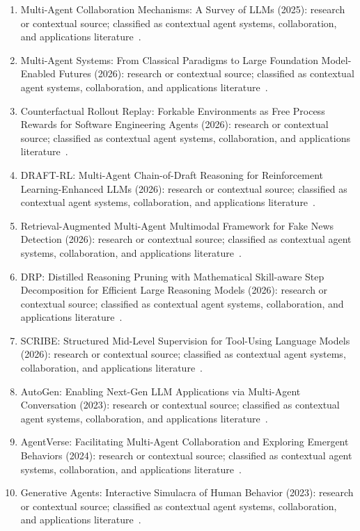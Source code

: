 \begin{enumerate}
\item Multi-Agent Collaboration Mechanisms: A Survey of {LLM}s (2025): research or contextual source; classified as contextual agent systems, collaboration, and applications literature~\cite{ext045}.
\item Multi-Agent Systems: From Classical Paradigms to Large Foundation Model-Enabled Futures (2026): research or contextual source; classified as contextual agent systems, collaboration, and applications literature~\cite{ext046}.
\item {Counterfactual Rollout Replay: Forkable Environments as Free Process Rewards for Software Engineering Agents} (2026): research or contextual source; classified as contextual agent systems, collaboration, and applications literature~\cite{ext055}.
\item {DRAFT-RL: Multi-Agent Chain-of-Draft Reasoning for Reinforcement Learning-Enhanced LLMs} (2026): research or contextual source; classified as contextual agent systems, collaboration, and applications literature~\cite{ext056}.
\item {Retrieval-Augmented Multi-Agent Multimodal Framework for Fake News Detection} (2026): research or contextual source; classified as contextual agent systems, collaboration, and applications literature~\cite{ext057}.
\item {DRP}: Distilled Reasoning Pruning with Mathematical Skill-aware Step Decomposition for Efficient Large Reasoning Models (2026): research or contextual source; classified as contextual agent systems, collaboration, and applications literature~\cite{ext059}.
\item {SCRIBE}: Structured Mid-Level Supervision for Tool-Using Language Models (2026): research or contextual source; classified as contextual agent systems, collaboration, and applications literature~\cite{ext061}.
\item AutoGen: Enabling Next-Gen LLM Applications via Multi-Agent Conversation (2023): research or contextual source; classified as contextual agent systems, collaboration, and applications literature~\cite{ext065}.
\item {AgentVerse}: Facilitating Multi-Agent Collaboration and Exploring Emergent Behaviors (2024): research or contextual source; classified as contextual agent systems, collaboration, and applications literature~\cite{ext066}.
\item Generative Agents: Interactive Simulacra of Human Behavior (2023): research or contextual source; classified as contextual agent systems, collaboration, and applications literature~\cite{ext067}.

\end{enumerate}
